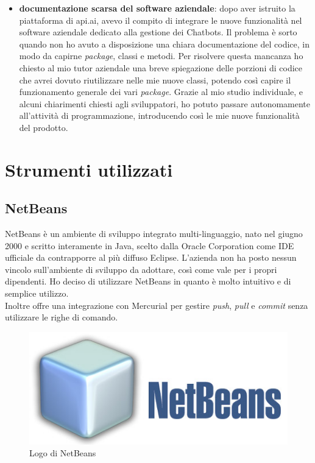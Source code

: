 \begin{itemize}
	\item \textbf{documentazione scarsa del software aziendale}: dopo aver istruito la piattaforma di api.ai, avevo il compito di integrare le nuove funzionalità nel software aziendale dedicato alla gestione dei \glspl{Chatbot}. Il problema è sorto quando non ho avuto a disposizione una chiara documentazione del codice, in modo da capirne \emph{package}, classi e metodi. Per risolvere questa mancanza ho chiesto al mio tutor aziendale una breve spiegazione delle porzioni di codice che avrei dovuto riutilizzare nelle mie nuove classi, potendo così capire il funzionamento generale dei vari \emph{package}. Grazie al mio studio individuale, e alcuni chiarimenti chiesti agli sviluppatori, ho potuto passare autonomamente all'attività di programmazione, introducendo così le mie nuove funzionalità del prodotto.
\end{itemize}

\section{Strumenti utilizzati}
\subsection{NetBeans}
NetBeans è un ambiente di sviluppo integrato multi-linguaggio, nato nel giugno 2000 e scritto interamente in Java, scelto dalla Oracle Corporation come \gls{IDE} ufficiale da contrapporre al più diffuso Eclipse.
L'azienda non ha posto nessun vincolo sull'ambiente di sviluppo da adottare, così come vale per i propri dipendenti. Ho deciso di utilizzare NetBeans in quanto è molto intuitivo e di semplice utilizzo.\\
Inoltre offre una integrazione con \gls{Mercurial} per gestire \emph{push}, \emph{pull} e \emph{commit} senza utilizzare le righe di comando.
\begin{figure}[h]
	\centering
	\includegraphics[scale=0.4]{../Immagini/netbeans.jpg}
	\caption{Logo di NetBeans}
\end{figure}
